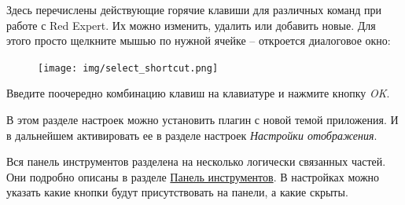 
Здесь перечислены действующие горячие клавиши для различных команд при работе с Red Expert. Их можно изменить, удалить или добавить новые. Для этого просто щелкните мышью по нужной ячейке -- откроется диалоговое окно:
\begin{figure}[H]
	\centering
	\texttt{[image: img/select\_shortcut.png]}
\end{figure}
Введите поочередно комбинацию клавиш на клавиатуре и нажмите кнопку \textit{OK}.


В этом разделе настроек можно установить плагин с новой темой приложения. И в дальнейшем активировать ее в разделе настроек \textit{Настройки отображения}.

\label{sec:pref_toolbar}

Вся панель инструментов разделена на несколько логически связанных частей. Они подробно описаны в разделе \hyperref[sec:toolbar]{Панель инструментов}. В настройках можно указать какие кнопки будут присутствовать на панели, а какие скрыты. 


